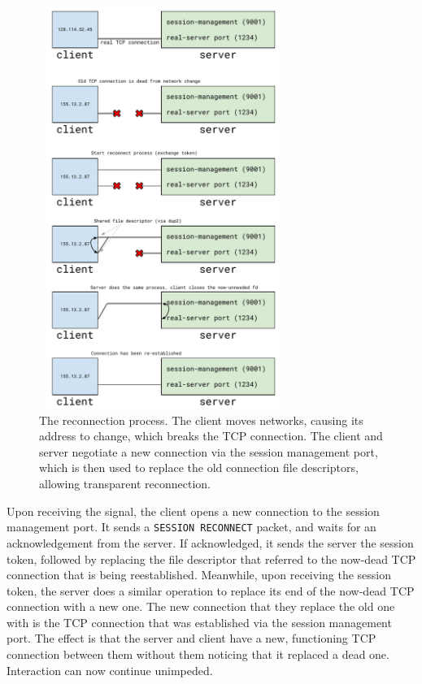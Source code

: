 \documentclass[twocolumn,10pt]{article}
\begin{document}
\begin{figure}
	\centering
	\includegraphics[width=80mm,height=131mm]{fig/reconn_diag}
	\caption{The reconnection process. The client moves networks, causing its
	address to change, which breaks the TCP connection. The client and server
	negotiate a new connection via the session management port, which is then
	used to replace the old connection file descriptors, allowing transparent
	reconnection.}
	\label{fig:recproc}
\end{figure}

Upon receiving the signal, the client opens a new connection to the session
management port. It sends a \texttt{SESSION RECONNECT} packet, and waits for an
acknowledgement from the server. If acknowledged, it sends the server the
session token, followed by replacing the file descriptor that referred to the
now-dead TCP connection that is being reestablished. Meanwhile, upon receiving
the session token, the server does a similar operation to replace its end of the
now-dead TCP connection with a new one. The new connection that they replace the
old one with is the TCP connection that was established via the session
management port. The effect is that the server and client have a new,
functioning TCP connection between them without them noticing that it replaced a
dead one. Interaction can now continue unimpeded.
\end{document}
